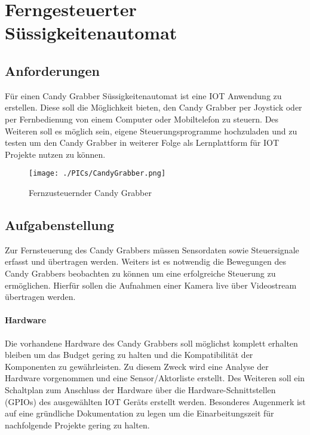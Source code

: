 \documentclass[BMR,Bachelor,ngerman]{twbook}%
\begin{document}
\chapter{Ferngesteuerter Süssigkeitenautomat}
\section{Anforderungen}
Für einen Candy Grabber Süssigkeitenautomat ist eine \ac{IOT} Anwendung zu erstellen. Diese soll die Möglichkeit bieten, den Candy Grabber per Joystick oder per Fernbedienung von einem Computer oder Mobiltelefon zu steuern. Des Weiteren soll es möglich sein, eigene Steuerungsprogramme hochzuladen und zu testen um den Candy Grabber in weiterer Folge als Lernplattform für \ac{IOT} Projekte nutzen zu können.
\begin{figure}[H]
\centering
\texttt{[image: ./PICs/CandyGrabber.png]}
\caption{Fernzusteuernder Candy Grabber}
\end{figure}

\section{Aufgabenstellung}
Zur Fernsteuerung des Candy Grabbers müssen Sensordaten sowie Steuersignale erfasst und übertragen werden. Weiters ist es notwendig die Bewegungen des Candy Grabbers beobachten zu können um eine erfolgreiche Steuerung zu ermöglichen. Hierfür sollen die Aufnahmen einer Kamera live über Videostream übertragen werden.
\subsubsection{Hardware}
Die vorhandene Hardware des Candy Grabbers soll möglichst komplett erhalten bleiben um das Budget gering zu halten und die Kompatibilität der Komponenten zu gewährleisten. Zu diesem Zweck wird eine Analyse der Hardware vorgenommen und eine Sensor/Aktorliste erstellt. Des Weiteren soll ein Schaltplan zum Anschluss der Hardware über die Hardware-Schnittstellen (\acp{GPIO}) des ausgewählten \ac{IOT} Geräts erstellt werden. Besonderes Augenmerk ist auf eine gründliche Dokumentation zu legen um die Einarbeitungszeit für nachfolgende Projekte gering zu halten.
\end{document}
